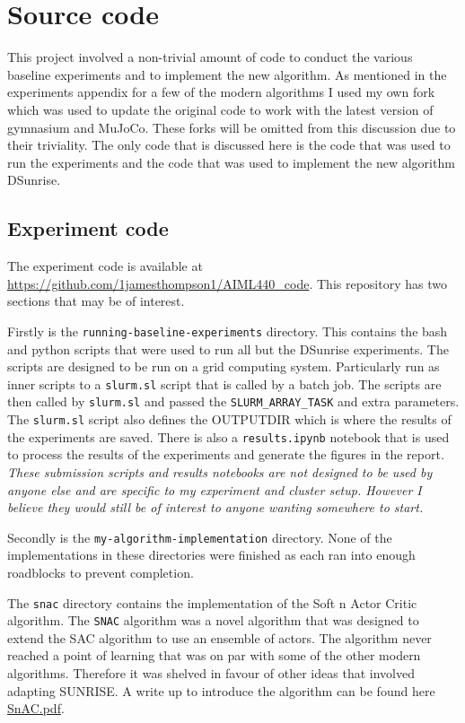 \section{Source code}
\label{sec:new_algorithm_source_code}

This project involved a non-trivial amount of code to conduct the various baseline experiments and to implement the new algorithm. As mentioned in the experiments appendix for a few of the modern algorithms I used my own fork which was used to update the original code to work with the latest version of gymnasium and MuJoCo. These forks will be omitted from this discussion due to their triviality. The only code that is discussed here is the code that was used to run the experiments and the code that was used to implement the new algorithm DSunrise.
\subsection{Experiment code}
The experiment code is available at \url{https://github.com/1jamesthompson1/AIML440_code}. This repository has two sections that may be of interest. 

Firstly is the \texttt{running-baseline-experiments} directory. This contains the bash and python scripts that were used to run all but the DSunrise experiments. The scripts are designed to be run on a grid computing system. Particularly run as inner scripts to a \texttt{slurm.sl} script that is called by a batch job. The scripts are then called by \texttt{slurm.sl} and passed the \texttt{SLURM\_ARRAY\_TASK} and extra parameters. The \texttt{slurm.sl} script also defines the OUTPUTDIR which is where the results of the experiments are saved. There is also a \texttt{results.ipynb} notebook that is used to process the results of the experiments and generate the figures in the report. \textit{These submission scripts and results notebooks are not designed to be used by anyone else and are specific to my experiment and cluster setup. However I believe they would still be of interest to anyone wanting somewhere to start.}

Secondly is the \texttt{my-algorithm-implementation} directory. None of the implementations in these directories were finished as each ran into enough roadblocks to prevent completion.

The \texttt{snac} directory contains the implementation of the Soft n Actor Critic algorithm. The \texttt{SNAC} algorithm was a novel algorithm that was designed to extend the SAC algorithm to use an ensemble of actors. The algorithm never reached a point of learning that was on par with some of the other modern algorithms. Therefore it was shelved in favour of other ideas that involved adapting SUNRISE. A write up to introduce the algorithm can be found here \href{https://github.com/1jamesthompson1/AIML440_report/blob/0e27a47f8df93954e2c0a70a535f7041ccb857df/my-algorithm-ideas/output/SnAC.pdf}{SnAC.pdf}.

